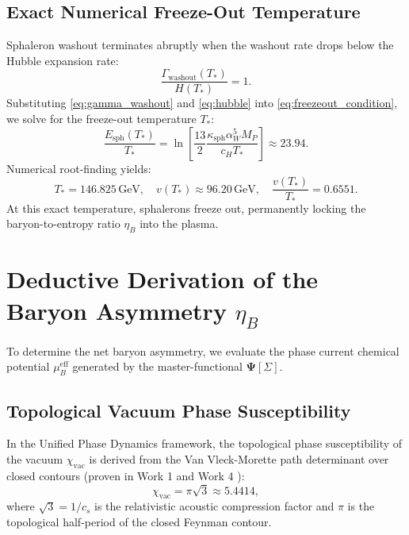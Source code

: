 \documentclass[11pt,a4paper]{article}
\begin{document}
\subsection{Exact Numerical Freeze-Out Temperature}
Sphaleron washout terminates abruptly when the washout rate drops below the Hubble expansion rate:
\begin{equation}
\frac{\Gamma_{\mathrm{washout}}(T_*)}{H(T_*)} = 1.
\label{eq:freezeout_condition}
\end{equation}
Substituting \eqref{eq:gamma_washout} and \eqref{eq:hubble} into \eqref{eq:freezeout_condition}, we solve for the freeze-out temperature $T_*$:
\begin{equation}
\frac{E_{\mathrm{sph}}(T_*)}{T_*} = \ln\left[ \frac{13}{2} \frac{\kappa_{\mathrm{sph}} \alpha_W^5 M_P}{c_H T_*} \right] \approx 23.94.
\end{equation}
Numerical root-finding yields:
\begin{equation}
T_* = \mathbf{146.825\,\mathrm{GeV}}, \quad v(T_*) \approx 96.20\,\mathrm{GeV}, \quad \frac{v(T_*)}{T_*} = \mathbf{0.6551}.
\label{eq:T_star_val}
\end{equation}
At this exact temperature, sphalerons freeze out, permanently locking the baryon-to-entropy ratio $\eta_B$ into the plasma.

\section{Deductive Derivation of the Baryon Asymmetry $\eta_B$}

To determine the net baryon asymmetry, we evaluate the phase current chemical potential $\mu_B^{\mathrm{eff}}$ generated by the master-functional $\mathbf{\Psi}[\Sigma]$.

\subsection{Topological Vacuum Phase Susceptibility}
In the Unified Phase Dynamics framework, the topological phase susceptibility of the vacuum $\chi_{\mathrm{vac}}$ is derived from the Van Vleck-Morette path determinant over closed contours (proven in Work 1 and Work 4 \cite{Pavliuk2026a}):
\begin{equation}
\chi_{\mathrm{vac}} = \pi \sqrt{3} \approx 5.4414,
\end{equation}
where $\sqrt{3} = 1/c_s$ is the relativistic acoustic compression factor and $\pi$ is the topological half-period of the closed Feynman contour.
\end{document}
